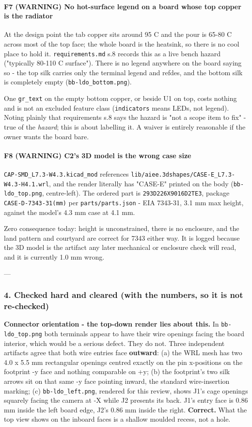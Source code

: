\documentclass[11pt,a4paper]{article}
\begin{document}
\paragraph*{F7 (WARNING) No hot-surface legend on a board whose top copper is the radiator}
At the design point the tab copper sits around 95 C and the pour is 65-80 C across most of the top face; the whole board is the heatsink, so there is no cool place to hold it. \texttt{requirements.md} s.8 records this as a live bench hazard ("typically 80-110 C surface"). There is no legend anywhere on the board saying so - the top silk carries only the terminal legend and refdes, and the bottom silk is completely empty (\texttt{bb-ldo\_bottom.png}).

One \texttt{gr\_text} on the empty bottom copper, or beside U1 on top, costs nothing and is not an excluded feature class (\texttt{indicators} means LEDs, not legend). Noting plainly that requirements s.8 says the hazard is "not a scope item to fix" - true of the \emph{hazard}; this is about labelling it. A waiver is entirely reasonable if the owner wants the board bare.

\paragraph*{F8 (WARNING) C2's 3D model is the wrong case size}
\texttt{CAP-SMD\_L7.3-W4.3.kicad\_mod} references \texttt{lib/aiee.3dshapes/CASE-E\_L7.3-W4.3-H4.1.wrl}, and the render literally has "CASE-E" printed on the body (\texttt{bb-ldo\_top.png}, centre-left). The ordered part is \texttt{293D226X9016D2TE3}, package \texttt{CASE-D-7343-31(mm)} per \texttt{parts/parts.json} - EIA 7343-31, 3.1 mm max height, against the model's 4.3 mm case at 4.1 mm.

Zero consequence today: height is unconstrained, there is no enclosure, and the land pattern and courtyard are correct for 7343 either way. It is logged because the 3D model is the artifact any later mechanical or enclosure check will read, and it is currently 1.0 mm wrong.

---

\subsubsection*{4. Checked hard and cleared (with the numbers, so it is not re-checked)}
\textbf{Connector orientation - the top-down render lies about this.} In \texttt{bb-ldo\_top.png} both terminals appear to have their wire openings facing the board interior, which would be a serious defect. They do not. Three independent artifacts agree that both wire entries face \textbf{outward}: (a) the WRL mesh has two 4.0 x 5.5 mm rectangular openings centred exactly on the pin x-positions on the footprint -y face and nothing comparable on +y; (b) the footprint's two silk arrows sit on that same -y face pointing inward, the standard wire-insertion marking; (c) \texttt{bb-ldo\_left.png}, rendered for this review, shows J1's cage openings squarely facing the camera at -X while J2 presents its back. J1's entry face is 0.86 mm inside the left board edge, J2's 0.86 mm inside the right. \textbf{Correct.} What the top view shows on the inboard faces is a shallow moulded recess, not a hole.
\end{document}

